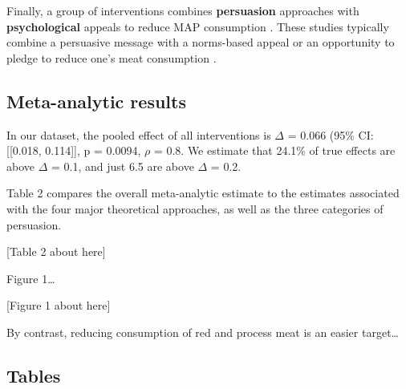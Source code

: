 \documentclass[sn-nature,referee,pdflatex]{sn-jnl}
\begin{document}
Finally, a group of interventions combines \textbf{persuasion}
approaches with \textbf{psychological} appeals to reduce MAP consumption
\citep{berndsen2005, bertolaso2015, carfora2023, fehrenbach2015, hennessy2016, mathur2021effectiveness, mattson2020, piester2020, shreedhar2021}.
These studies typically combine a persuasive message with a norms-based
appeal \citep{piester2020, mattson2020} or an opportunity to pledge to
reduce one's meat consumption
\citep{mathur2021effectiveness, shreedhar2021}.

\subsection{Meta-analytic results}\label{meta-analytic-results}

In our dataset, the pooled effect of all interventions is \(\Delta\) =
0.066 (95\% CI: {[}{[}0.018, 0.114{]}{]}, p = 0.0094, \(\rho\) = 0.8. We
estimate that 24.1\% of true effects are above \(\Delta\) = 0.1, and
just 6.5 are above \(\Delta\) = 0.2.

Table 2 compares the overall meta-analytic estimate to the estimates
associated with the four major theoretical approaches, as well as the
three categories of persuasion.

\begin{center}
[Table 2 about here]
\end{center}

Figure 1\ldots{}

\begin{center}
[Figure 1 about here]
\end{center}

By contrast, reducing consumption of red and process meat is an easier
target\ldots{}

\subsection{Tables}\label{tables}
\end{document}

